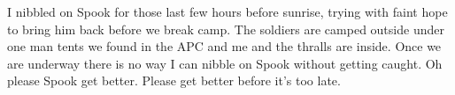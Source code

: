 I nibbled on Spook for those last few hours before sunrise, trying with faint hope to bring him back before we break camp. The soldiers are camped outside under one man tents we found in the APC and me and the thralls are inside. Once we are underway there is no way I can nibble on Spook without getting caught. Oh please Spook get better. Please get better before it's too late.

\Parsep














